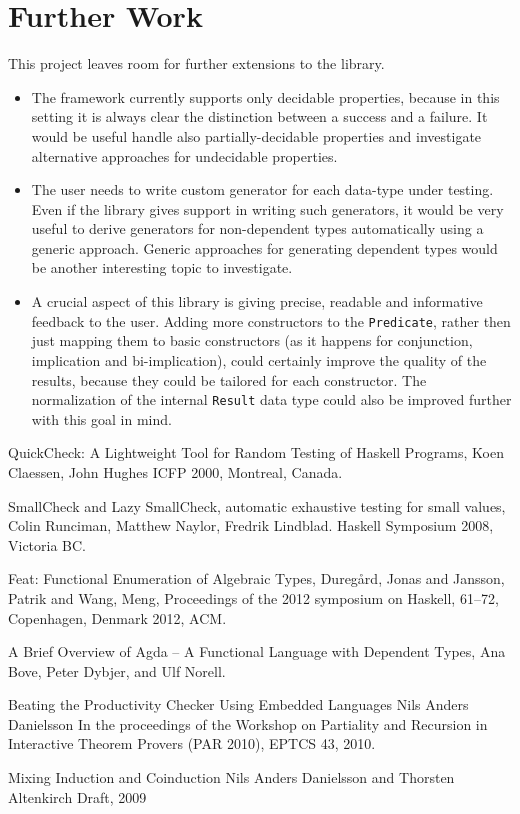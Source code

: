 \documentclass[10pt,a4paper]{article}
\begin{document}
\section{Further Work}
This project leaves room for further extensions to the library.
\begin{itemize}
	\item The framework currently supports only decidable properties, because in this setting it is always clear the distinction between a success and a failure. 	It would be useful handle also partially-decidable properties and investigate alternative approaches for undecidable properties.	
	\item The user needs to write custom generator for each data-type under testing. Even if the library gives support in writing such generators, it would be very useful to derive generators for non-dependent types automatically using a generic approach. Generic approaches for generating dependent types would be another interesting topic to investigate.
	
	\item A crucial aspect of this library is giving precise, readable and informative feedback to the user. Adding more constructors to the \texttt{Predicate}, rather then just mapping them to basic constructors (as it happens for conjunction, implication and bi-implication), could certainly improve the quality of the results, because they could be tailored for each constructor. The normalization of the internal \texttt{Result} data type could also be improved further with this goal in mind.
\end{itemize}

\begin{thebibliography}{1}
		
	QuickCheck: A Lightweight Tool for Random Testing of Haskell Programs,
	Koen Claessen, John Hughes
	ICFP 2000, Montreal, Canada.
	
	SmallCheck and Lazy SmallCheck, automatic exhaustive testing for small values,
	Colin Runciman, Matthew Naylor, Fredrik Lindblad.
	Haskell Symposium 2008, Victoria BC.
	
	Feat: Functional Enumeration of Algebraic Types,
  	Dureg{\aa}rd, Jonas   and   Jansson, Patrik   and   Wang, Meng,
  	Proceedings of the 2012 symposium on Haskell, 61--72,
	Copenhagen, Denmark
	2012, ACM.

	A Brief Overview of Agda – A Functional Language with Dependent Types,
	Ana Bove, Peter Dybjer, and Ulf Norell.
	
	Beating the Productivity Checker Using Embedded Languages
	Nils Anders Danielsson
	In the proceedings of the Workshop on Partiality and Recursion in Interactive Theorem Provers (PAR 2010), EPTCS 43, 2010.

	Mixing Induction and Coinduction
	Nils Anders Danielsson and Thorsten Altenkirch
	Draft, 2009

\end{thebibliography}
\end{document}
